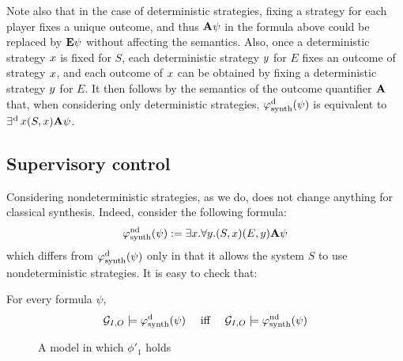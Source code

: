 Note also that in the case of deterministic strategies, fixing a
strategy for each player fixes a unique outcome, and thus ${\bf A}\psi$ in
the formula above could be replaced by ${\bf E}\psi$ without affecting the semantics.
Also, once a deterministic strategy $x$ is fixed for $S$, each
deterministic strategy $y$ for $E$ fixes an outcome of strategy $x$, and each outcome
of $x$ can be obtained by fixing a deterministic strategy $y$
for $E$. It then follows by the
semantics of the outcome quantifier ${\bf A}$ that, when
considering only deterministic strategies,
$\varphi^{\text{d}}_{\text{synth}}(\psi)$ is equivalent to $\operatorname*{\exists^{\hskip.5pt\text{d}}} x (S,x){\bf A}\psi$.

\subsection{Supervisory control}
\label{sec-nd-synth}

Considering nondeterministic strategies, as we do, does not change
anything for classical \LTL synthesis. Indeed, consider the following
formula:
\[\varphi^{\text{nd}}_{\text{synth}}(\psi):=\exists x.   \forall y.
 (S,x)(E,y) {\bf A} \psi\]
which differs from $\varphi^{\text{d}}_{\text{synth}}(\psi)$ only in that it allows the system
$S$ to use nondeterministic strategies. It is easy to check that:
\begin{proposition}
  \label{prop-equiv-synth}
  For every \LTL formula $\psi$, \[\CGS_{I,O}\models
  \phisynthdet(\psi) \quad\mbox{ iff } \quad\CGS_{I,O}\models \phisynthndet(\psi)\]
\end{proposition}

\begin{figure}
  \centering
{}  
  \caption{A model in which $\phi'_1$ holds}
  \label{fig:example}
\end{figure}

